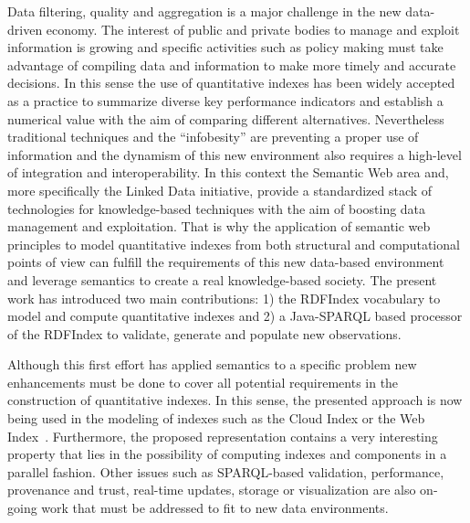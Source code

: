 Data filtering, quality and aggregation is a major challenge in the 
new data-driven economy. The interest of public and private bodies 
to manage and exploit information is growing and specific activities 
such as policy making must take advantage of compiling data and information 
to make more timely and accurate decisions. In this sense the use 
of quantitative indexes has been widely accepted as a practice to 
summarize diverse key performance indicators and establish a numerical 
value with the aim of comparing different alternatives. Nevertheless traditional techniques 
and the ``infobesity'' are preventing a proper use of information and the dynamism 
of this new environment also requires a high-level of integration and interoperability. In this 
context the Semantic Web area and, more specifically the Linked Data initiative, 
provide a standardized stack of technologies for knowledge-based techniques with 
the aim of boosting data management and exploitation. That is why the application 
of semantic web principles to model quantitative indexes from both structural and 
computational points of view can fulfill the requirements of this new data-based 
environment and leverage semantics to create a real knowledge-based society. The 
present work has introduced two main contributions: 1) the RDFIndex vocabulary to model and compute quantitative indexes and 
2) a Java-SPARQL based processor of the RDFIndex to validate, generate and populate new observations.

Although this first effort has applied semantics to a specific problem new enhancements 
must be done to cover all potential requirements in the construction of quantitative indexes. In this sense, the presented 
approach is now being used in the modeling of indexes such as the Cloud Index or 
the Web Index~\cite{webindexlod}. Furthermore, the proposed representation contains a very interesting property 
that lies in the possibility of computing indexes and components in a parallel fashion. 
Other issues such as SPARQL-based validation, performance, provenance and trust, real-time updates, storage or visualization are 
also on-going work that must be addressed to fit to new data environments.





